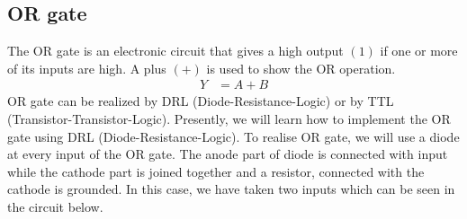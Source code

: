 	\subsection{OR gate}
		The OR gate is an electronic circuit that gives a high output $(1)$ if one or more of its inputs are high. A plus $(+)$ is used to show the OR operation.		
		\begin{align*}
			Y &= A + B
		\end{align*}		
		OR gate can be realized by DRL (Diode-Resistance-Logic) or by TTL (Transistor-Transistor-Logic). Presently, we will learn how to implement the OR gate using DRL (Diode-Resistance-Logic). To realise OR gate, we will use a diode at every input of the OR gate. The anode part of diode is connected with input while the cathode part is joined together and a resistor, connected with the cathode is grounded. In this case, we have taken two inputs which can be seen in the circuit below.
		
